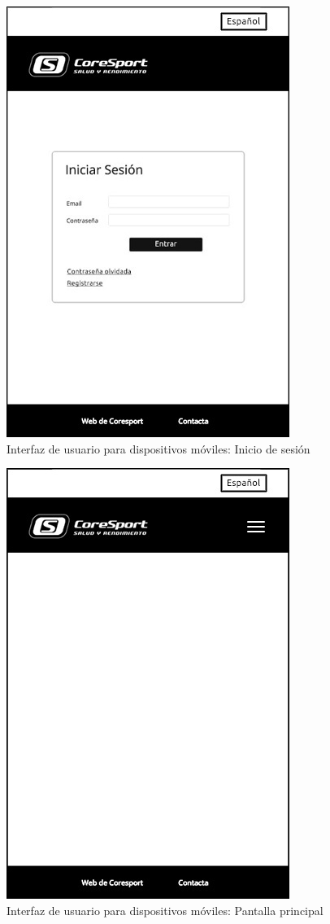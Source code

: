 \begin{figure}[h!]
\centering
  \includegraphics[scale=.50]{img/interfaz/inicio-sesion-movil.jpg}
  \caption{Interfaz de usuario para dispositivos móviles: Inicio de sesión}
  \label{fig:interfaz-inicio-sesion-movil}
\end{figure}

\begin{figure}[h!]
\centering
  \includegraphics[scale=.50]{img/interfaz/pantalla-principal-movil.jpg}
  \caption{Interfaz de usuario para dispositivos móviles: Pantalla principal}
  \label{fig:interfaz-pantalla-principal-movil}
\end{figure}

